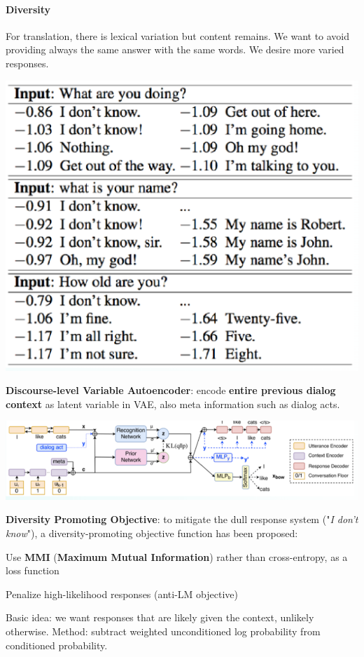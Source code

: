 \documentclass[10pt]{report}
\begin{document}
\paragraph{Diversity} For translation, there is lexical variation but content remains. We want to avoid providing always the same answer with the same words. We desire more varied responses.
\begin{center}
	\includegraphics[scale=0.5]{136.png}
\end{center}
\textbf{Discourse-level Variable Autoencoder}: encode \textbf{entire previous dialog context} as latent variable in VAE, also meta information such as dialog acts.
\begin{center}
	\includegraphics[scale=0.5]{137.png}
\end{center}
\textbf{Diversity Promoting Objective}: to mitigate the dull response system ("\textit{I don't know}"), a diversity-promoting objective function has been proposed:
\begin{list}{}{}
	\item Use \textbf{MMI} (\textbf{Maximum Mutual Information}) rather than cross-entropy, as a loss function
	\item Penalize high-likelihood responses (anti-LM objective)
\end{list}
Basic idea: we want responses that are likely given the context, unlikely otherwise. Method: subtract weighted unconditioned log probability from conditioned probability.
\end{document}
